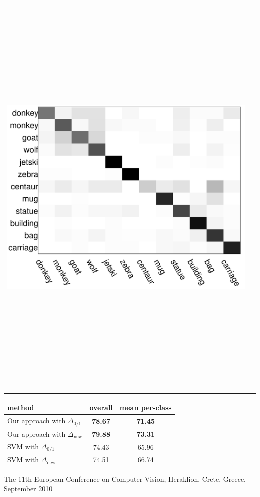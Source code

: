 \documentclass[a0]{a0poster}
\begin{document}
\begin{center}
{\begin{center}
\begin{tabular}{cc}
\includegraphics[height=8in, width=11in]{fig/yahoo_conf}&
\end{tabular}
\end{center}

{\Large
\begin{center}
\begin{tabular}{|l||c|c|}
\hline
method & overall & mean per-class\\
\hline\hline
Our approach with $\Delta_{0/1}$ & {\bf 78.67} & {\bf 71.45}\\
Our approach with $\Delta_{\mathrm{new}}$ & {\bf 79.88} & {\bf 73.31}\\
\hline
SVM with $\Delta_{0/1}$ & 74.43 & 65.96\\
SVM with $\Delta_{\mathrm{new}}$ & 74.51 & 66.74\\
\hline
\end{tabular}
\end{center}
}
}
%
\end{center}

\vfill
\begin{center}
{\color{DarkBlue}\LARGE \hspace{5cm}The 11th European Conference on Computer Vision, Heraklion, Crete, Greece, September 2010\hspace{5cm}}\\
\end{center}
\end{document}

